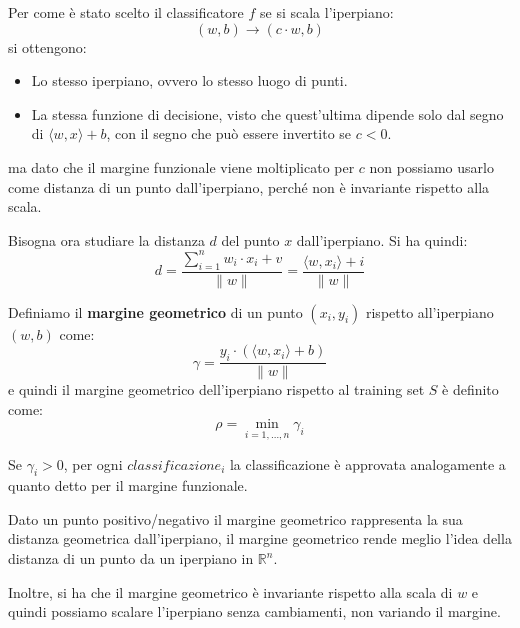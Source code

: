 Per come è stato scelto il classificatore $f$ se si scala l'iperpiano:
\begin{equation}
    (w, b) \to (c \cdot w, b)
\end{equation}
si ottengono:
\begin{itemize}
    \item Lo stesso iperpiano, ovvero lo stesso luogo di punti.
    \item La stessa funzione di decisione, visto che quest'ultima dipende solo
          dal segno di $\langle w, x \rangle + b$, con il segno che può essere
          invertito se $c < 0$.
\end{itemize}
ma dato che il margine funzionale viene moltiplicato per $c$ non possiamo usarlo
come distanza di un punto dall'iperpiano, perché non è invariante rispetto alla
scala.

Bisogna ora studiare la distanza $d$ del punto $x$ dall'iperpiano. Si ha quindi:
\begin{equation}
    d = \frac{\sum_{i = 1} ^ n w_i \cdot x_i + v}{\| w \|} = \frac{\langle w, x_i \rangle + i}{\|  w \|}
\end{equation}
\begin{definizione}
    Definiamo il \textbf{margine geometrico} di un punto $(x_i, y_i)$ rispetto
    all'iperpiano $(w, b)$ come:
    \begin{equation}
        \gamma = \frac{y_i \cdot (\langle w, x_i \rangle + b)}{\| w \|}
    \end{equation}
    e quindi il margine geometrico dell'iperpiano rispetto al training set $S$ è
    definito come:
    \begin{equation}
        \rho =  \min_{i = 1, \dots, n} {\gamma}_i
    \end{equation}
\end{definizione}
\begin{teorema}
    Se $\gamma_i > 0$, per ogni $classificazione_i$ la classificazione è approvata
    analogamente a quanto detto per il margine funzionale.
\end{teorema}
Dato un punto positivo/negativo il margine geometrico rappresenta la sua distanza
geometrica dall'iperpiano, il margine geometrico rende meglio l'idea della distanza
di un punto da un iperpiano in $\mathbb{R}^n$.

Inoltre, si ha che il margine geometrico è invariante rispetto alla scala di $w$
e quindi possiamo scalare l'iperpiano senza cambiamenti, non variando il margine.

